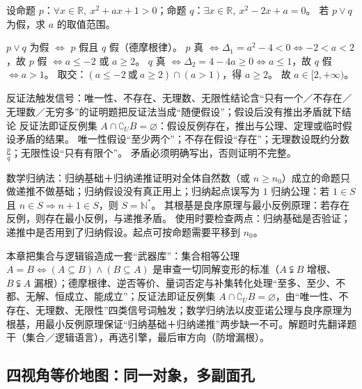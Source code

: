 \begin{explore}
\begin{example}
设命题 $p$：$\forall x\in\mathbb{R},\ x^2+ax+1>0$；命题 $q$：$\exists x\in\mathbb{R},\ x^2-2x+a=0$。
若 $p\lor q$ 为假，求 $a$ 的取值范围。
\end{example}
\begin{solution}
$p\lor q$ 为假 $\iff$ $p$ 假且 $q$ 假（德摩根律）。
$p$ 真 $\iff\Delta_1=a^2-4<0\iff-2<a<2$，故 $p$ 假 $\iff a\leq-2$ 或 $a\geq2$。
$q$ 真 $\iff\Delta_2=4-4a\geq0\iff a\leq1$，故 $q$ 假 $\iff a>1$。
取交：$(a\leq-2\ \text{或}\ a\geq2)\cap(a>1)$，得 $a\geq2$。
故 $a\in[2,+\infty)$。
\end{solution}

\begin{conccard}[三级]{反证法触发信号：唯一性、不存在、无理数、无限性}{结论含“只有一个／不存在／无理数／无穷多”的证明题}{把反证法当成“随便假设”；假设后没有推出矛盾就下结论}
反证法即证反例集 $A\cap\complement_U B=\varnothing$：假设反例存在，推出与公理、定理或临时假设矛盾的结果。
唯一性假设“至少两个”；不存在假设“存在”；无理数设既约分数 $\frac pq$；无限性设“只有有限个”。
矛盾必须明确写出，否则证明不完整。
\end{conccard}

\begin{conccard}[三级]{数学归纳法：归纳基础＋归纳递推}{证明对全体自然数（或 $n\geq n_0$）成立的命题}{只做递推不做基础；归纳假设没有真正用上；归纳起点误写为 $1$}
归纳公理：若 $1\in S$ 且 $n\in S\Rightarrow n+1\in S$，则 $S=\mathbb{N}^*$。
其根基是良序原理与最小反例原理：若存在反例，则存在最小反例，与递推矛盾。
使用时要检查两点：归纳基础是否验证；递推中是否用到了归纳假设。起点可按命题需要平移到 $n_0$。
\end{conccard}

\begin{summary}
本章把集合与逻辑锻造成一套“武器库”：集合相等公理 $A=B\iff(A\subseteq B)\land(B\subseteq A)$ 是审查一切同解变形的标准（$A\subsetneqq B$ 增根、$B\subsetneqq A$ 漏根）；德摩根律、逆否等价、量词否定与补集转化处理“至多、至少、不都、无解、恒成立、能成立”；反证法即证反例集 $A\cap\complement_U B=\varnothing$，由“唯一性、不存在、无理数、无限性”四类信号词触发；数学归纳法以皮亚诺公理与良序原理为根基，用最小反例原理保证“归纳基础＋归纳递推”两步缺一不可。解题时先翻译题干（集合／逻辑语言），再选引擎，最后审方向（防增漏根）。
\end{summary}

\end{explore}

\subsection{四视角等价地图：同一对象，多副面孔}


